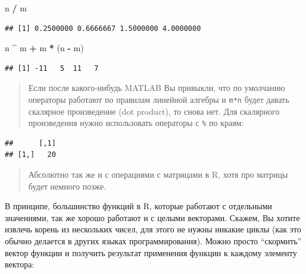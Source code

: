 \documentclass[]{book}
\newenvironment{Shaded}{\begin{snugshade}}{\end{snugshade}}
\newcommand{\NormalTok}[1]{#1}
\newcommand{\OperatorTok}[1]{\textcolor[rgb]{0.81,0.36,0.00}{\textbf{#1}}}
\newcommand{\StringTok}[1]{\textcolor[rgb]{0.31,0.60,0.02}{#1}}
\begin{document}
\begin{Shaded}
\begin{Highlighting}[]
\NormalTok{n }\OperatorTok{/}\StringTok{ }\NormalTok{m}
\end{Highlighting}
\end{Shaded}

\begin{verbatim}
## [1] 0.2500000 0.6666667 1.5000000 4.0000000
\end{verbatim}

\begin{Shaded}
\begin{Highlighting}[]
\NormalTok{n }\OperatorTok{^}\StringTok{ }\NormalTok{m }\OperatorTok{+}\StringTok{ }\NormalTok{m }\OperatorTok{*}\StringTok{ }\NormalTok{(n }\OperatorTok{-}\StringTok{ }\NormalTok{m)}
\end{Highlighting}
\end{Shaded}

\begin{verbatim}
## [1] -11   5  11   7
\end{verbatim}

\begin{quote}
Если после какого-нибудь MATLAB Вы привыкли, что по умолчанию операторы работают по правилам линейной алгебры и \texttt{m*n} будет давать скалярное произведение (dot product), то снова нет. Для скалярного произведения нужно использовать операторы с \texttt{\%} по краям:
\end{quote}

\begin{Shaded}
\end{Shaded}

\begin{verbatim}
##      [,1]
## [1,]   20
\end{verbatim}

\begin{quote}
Абсолютно так же и с операциями с матрицами в R, хотя про матрицы будет немного позже.
\end{quote}

В принципе, большинство функций в R, которые работают с отдельными значениями, так же хорошо работают и с целыми векторами. Скажем, Вы хотите извлечь корень из нескольких чисел, для этого не нужны никакие циклы (как это обычно делается в других языках программирования). Можно просто ``скормить'' вектор функции и получить результат применения функции к каждому элементу вектора:
\end{document}
